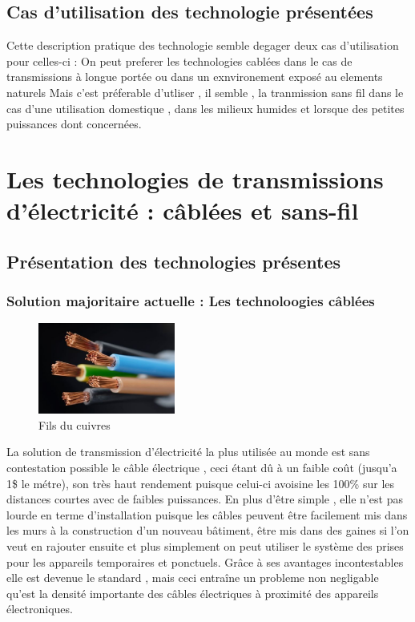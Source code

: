 \documentclass[12pt]{report}
\begin{document}
\section{Cas d'utilisation des technologie présentées}
	Cette description pratique des technologie semble degager deux cas d'utilisation pour celles-ci :
	On peut preferer les technologies cablées dans le cas de transmissions à longue portée ou dans un exnvironement exposé au elements naturels
	Mais c'est préferable d'utliser , il semble , la tranmission sans fil dans le cas d'une utilisation domestique , dans les milieux humides et lorsque des petites puissances dont concernées.


\chapter{Les technologies de transmissions d'électricité : câblées et sans-fil}
\section{Présentation des technologies présentes}
\subsection{Solution majoritaire actuelle : Les technoloogies câblées}
\begin{figure}
  \begin{center}
    \includegraphics[width=0.4\textwidth]{copperWire}
  \end{center}
  \caption{Fils du cuivres}
\end{figure} La solution de transmission d'électricité la plus utilisée au monde est sans contestation possible le câble électrique , ceci étant dû à un faible coût (jusqu'a 1\$ le métre), son très haut rendement puisque celui-ci avoisine les 100\% sur les distances courtes avec de faibles puissances. En plus d'être simple , elle n'est pas lourde en terme d'installation puisque les câbles peuvent être facilement mis dans les murs à la construction d'un nouveau bâtiment, être mis dans des gaines si l'on veut en rajouter ensuite et plus simplement on peut utiliser le système des prises pour les appareils temporaires et ponctuels. Grâce à ses avantages incontestables elle est devenue le standard , mais ceci entraîne un probleme non negligable qu'est la densité importante des câbles électriques à proximité des appareils électroniques.
	
\end{document}
